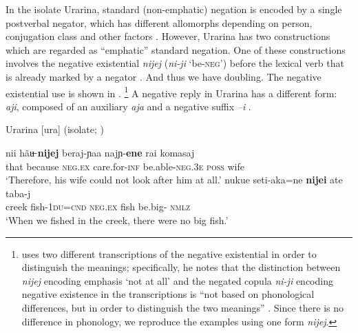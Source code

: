 ﻿\documentclass[output=paper]{langsci/langscibook}
\begin{document}
In the isolate Urarina, standard (non-emphatic) negation is encoded by a
single postverbal negator, which has different allomorphs depending on
person, conjugation class and other factors \citep[484]{Olawsky2006}.
However, Urarina has two constructions which are regarded as ``emphatic''
standard negation. One of these constructions involves the negative
existential \textit{nijej} (\textit{ni-ji} `be-\textsc{neg}') before the
lexical verb that is already marked by a negator . And thus
we have doubling. The negative existential use is shown in
.%
%
\footnote{\textcite{Olawsky2006} uses two different
transcriptions of the negative existential in order to distinguish the
meanings; specifically, he notes that the distinction between
\textit{nijej} encoding emphasis `not at all' and the negated copula
\textit{ni-ji} encoding negative existence in the transcriptions is ``not
based on phonological differences, but in order to distinguish the two
meanings'' \parencite[555, footnote 65]{Olawsky2006}. Since there is no
difference in phonology, we reproduce the examples using one form
\textit{nijej}.} %
%
A negative reply in Urarina has a different form:
\textit{aji}, composed of an auxiliary \textit{aja} and a negative suffix
\textit{–i} \parencite[400]{Olawsky2006}. 
%
\begin{exe}\ex\label{ex:int-urarina-wife-fish}
Urarina [ura] (isolate; \citealt[554, 556]{Olawsky2006})
    \begin{xlist}
    \ex\label{ex:int-urarina-wife}
    \gll nii hãu̶ \textbf{nijej} beraj-ɲaa najɲ-\textbf{ene}    
    rai      komasaj \\
    that because \textsc{neg.ex} care.for-\textsc{inf}
    be.able-\textsc{neg.3e} \textsc{poss}   wife\\
    \glt `Therefore, his wife could not look after him at all.'
    \ex\label{ex:int-urarina-fish}
    \gll nukue  seti-aka=ne    \textbf{nijei}  ate  taba-j \\
    creek   fish-\textsc{1du=cnd}       \textsc{neg.ex}  fish   
    be.big- \textsc{nmlz}\\
    \glt `When we fished in the creek, there were no big fish.'
    \end{xlist}\end{exe}
\end{document}
